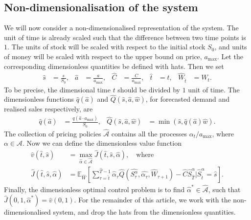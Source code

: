 \documentclass[main.tex]{subfiles}
\begin{document}
\subsection{Non-dimensionalisation of the system}
We will now consider a non-dimensionalised
representation of the system.
The unit of time is already scaled such that
the difference between two time points is $1$.
The units of stock will be  scaled with
respect to
the initial stock $S_0$, and units of money will be scaled with respect to
the upper bound on
price, $a_{\mathrm{max}}$.
Let the corresponding dimensionless quantities be defined with hats.
Then we set
\begin{align}
  \hat s
  &= \frac{s}{S_0},
  &\hat a
  &=\frac{a}{a_{\mathrm{max}}},
  &\hat C&=\frac{C}{a_{\mathrm{max}}},
  &\hat t &= t,
  &\hat W_{\hat t}&=W_{t}.
\end{align}
To be precise, the dimensional time $t$ should be divided by $1$ unit of time.
The dimensionless functions $\hat q(\hat a)$ and $\hat Q(\hat s,\hat
a, \hat w)$,
for forecasted demand
and realised sales respectively, are
\begin{align}
  \hat q(\hat a)&= \frac{q(\hat a\cdot a_{\max})}{S_0},
  &\hat Q(\hat s,\hat a, \hat w)&= \min(\hat s, \hat q(\hat a)\hat w).
\end{align}
The collection of pricing policies $\hat{\mathcal A}$ contains all
the processes $\alpha_t/a_{\mathrm{max}}$, where $\alpha\in \mathcal
A$. Now we can define the dimensionless value function
\begin{align}\label{eq:value_function_def_nondim}
  \hat v(\hat t,\hat s)&=\max_{\hat \alpha\in\hat{\mathcal A}}
                         \hat J(\hat t,\hat s,\hat \alpha),\quad\text{where}\\
  \hat J(\hat t,\hat s,\hat \alpha)&=
                                     \mathbb E_{\hat W}\left[ \sum_{\tau=\hat t}^{\hat T-1}
                                     \hat \alpha_\tau\hat Q(\hat
                                     {S_\tau^\alpha},\hat{\alpha_\tau},\hat
                                     W_{\tau+1})
                                     - \hat C \hat{S}_{\hat{T}}^\alpha \big\vert \hat{S}_{\hat{t}}^\alpha =
                                     \hat s
                                     \right].
                                     \label{eq:value_function_def_nondim2}
\end{align}
Finally, the dimensionless optimal control problem
is to find $\hat \alpha^*\in\hat{\mathcal A}$, such that
$\hat J(0,1,\hat \alpha^*)=\hat v(0,1)$.
For the remainder of this article, we work with the
non-dimensionalised system, and drop the hats from the
dimensionless quantities.
\end{document}
